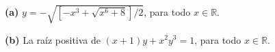 \noindent\textbf{(a)} $y=-\sqrt{[-x^3+\sqrt{x^6+8}]/2}$, para todo $x\in\mathbb R$.

\noindent\textbf{(b)} La raíz positiva de $(x+1)y+x^2y^3=1$, para todo $x\in\mathbb R$.
